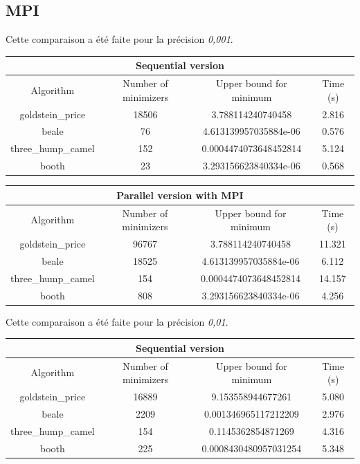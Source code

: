 \documentclass[a4paper,10pt]{article}
\begin{document}
\subsection{MPI}

Cette comparaison a été faite pour la précision \emph{0,001}.

\begin{tabular}{|c|c|c|c|}
\hline
\multicolumn{4}{|c|}{Sequential version}\\
\hline
Algorithm & Number of minimizers & Upper bound for minimum & Time (s) \\
\hline
goldstein\_price & 18506 & 3.788114240740458 & 2.816\\
\hline
beale & 76 & 4.613139957035884e-06 & 0.576\\
\hline
three\_hump\_camel & 152 & 0.0004474073648452814 & 5.124\\
\hline
booth & 23 & 3.293156623840334e-06 & 0.568\\
\hline
\end{tabular}

\begin{tabular}{|c|c|c|c|}
\hline
\multicolumn{4}{|c|}{Parallel version with MPI}\\
\hline
Algorithm & Number of minimizers & Upper bound for minimum & Time (s) \\
\hline
goldstein\_price & 96767 & 3.788114240740458 & 11.321\\
\hline
beale & 18525 & 4.613139957035884e-06 & 6.112\\
\hline
three\_hump\_camel & 154 & 0.0004474073648452814 & 14.157\\
\hline
booth & 808 & 3.293156623840334e-06 & 4.256\\
\hline
\end{tabular}

Cette comparaison a été faite pour la précision \emph{0,01}.

\begin{tabular}{|c|c|c|c|}
\hline
\multicolumn{4}{|c|}{Sequential version}\\
\hline
Algorithm & Number of minimizers & Upper bound for minimum & Time (s) \\
\hline
goldstein\_price & 16889 & 9.153558944677261 & 5.080\\
\hline
beale & 2209 & 0.001346965117212209 & 2.976\\
\hline
three\_hump\_camel & 154 & 0.1145362854871269 & 4.316\\
\hline
booth & 225 & 0.0008430480957031254 & 5.348\\
\hline
\end{tabular}
\end{document}
